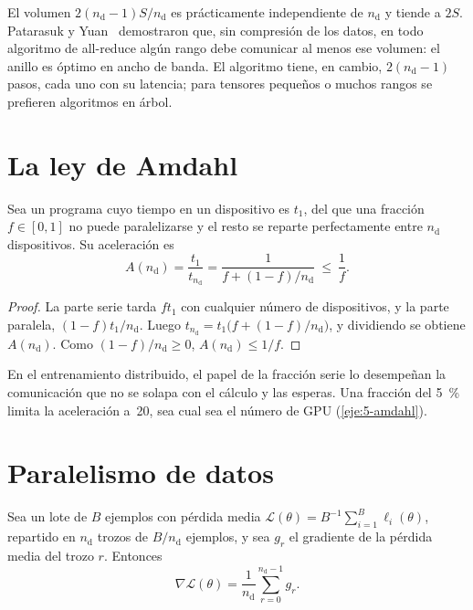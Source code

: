 \begin{observacion}
El volumen $2(n_{\mathrm{d}}-1)S/n_{\mathrm{d}}$ es prácticamente independiente de $n_{\mathrm{d}}$ y tiende a $2S$. Patarasuk y Yuan~\cite{patarasuk} demostraron que, sin compresión de los datos, en todo algoritmo de all-reduce algún rango debe comunicar al menos ese volumen: el anillo es óptimo en ancho de banda. El algoritmo tiene, en cambio, $2(n_{\mathrm{d}}-1)$ pasos, cada uno con su latencia; para tensores pequeños o muchos rangos se prefieren algoritmos en árbol.
\end{observacion}

\section{La ley de Amdahl}

\begin{teorema}\label{teo:amdahl}
Sea un programa cuyo tiempo en un dispositivo es $t_1$, del que una fracción $f\in[0,1]$ no puede paralelizarse y el resto se reparte perfectamente entre $n_{\mathrm{d}}$ dispositivos. Su aceleración es
\[
A(n_{\mathrm{d}})=\frac{t_1}{t_{n_{\mathrm{d}}}}=\frac{1}{f+(1-f)/n_{\mathrm{d}}}\ \le\ \frac{1}{f}.
\]
\end{teorema}

\begin{proof}
La parte serie tarda $ft_1$ con cualquier número de dispositivos, y la parte paralela, $(1-f)t_1/n_{\mathrm{d}}$. Luego $t_{n_{\mathrm{d}}}=t_1\bigl(f+(1-f)/n_{\mathrm{d}}\bigr)$, y dividiendo se obtiene $A(n_{\mathrm{d}})$. Como $(1-f)/n_{\mathrm{d}}\ge 0$, $A(n_{\mathrm{d}})\le 1/f$.
\end{proof}

En el entrenamiento distribuido, el papel de la fracción serie lo desempeñan la comunicación que no se solapa con el cálculo y las esperas. Una fracción del 5~\% limita la aceleración a~20, sea cual sea el número de GPU (\cref{eje:5-amdahl}).

\section{Paralelismo de datos}

\begin{proposicion}\label{prop:datos}
Sea un lote de $B$ ejemplos con pérdida media $\mathcal{L}(\theta)=B^{-1}\sum_{i=1}^{B}\ell_i(\theta)$, repartido en $n_{\mathrm{d}}$ trozos de $B/n_{\mathrm{d}}$ ejemplos, y sea $g_r$ el gradiente de la pérdida media del trozo $r$. Entonces
\[
\nabla\mathcal{L}(\theta)=\frac{1}{n_{\mathrm{d}}}\sum_{r=0}^{n_{\mathrm{d}}-1}g_r.
\]
\end{proposicion}

